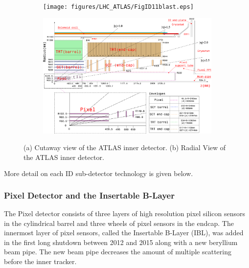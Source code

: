 \begin{figure}[h!]
  \begin{center}
    \begin{subfigure}[a]{0.85\textwidth}   
	\texttt{[image: figures/LHC\_ATLAS/FigID11blast.eps]}
         \caption{ }
    \end{subfigure}
    \begin{subfigure}[b]{0.85\textwidth}   
	\includegraphics[width=\textwidth, angle=0]{figures/LHC_ATLAS/FigID26-mod-011107.eps}
         \caption{ }
    \end{subfigure}
\caption[~Radial and Cutaway view of the ATLAS inner detector]{ (a) Cutaway view of the ATLAS inner detector. (b) Radial View of the ATLAS inner detector. \cite{ATLAS_JINST} \label{LHC:fig:ATLASID}}
\end{center}
\end{figure}

\indent More detail on each ID sub-detector technology is given below. \\

\subsubsection*{ Pixel Detector and the Insertable B-Layer}

\indent The Pixel detector consists of three layers of high resolution pixel silicon sensors in the cylindrical barrel and three wheels of pixel sensors in the endcap.  The innermost layer of pixel sensors, called the Insertable B-Layer (IBL), was added in the first long shutdown between 2012 and 2015 along with a new beryllium beam pipe.  The new beam pipe decreases the amount of multiple scattering before the inner tracker. \\

